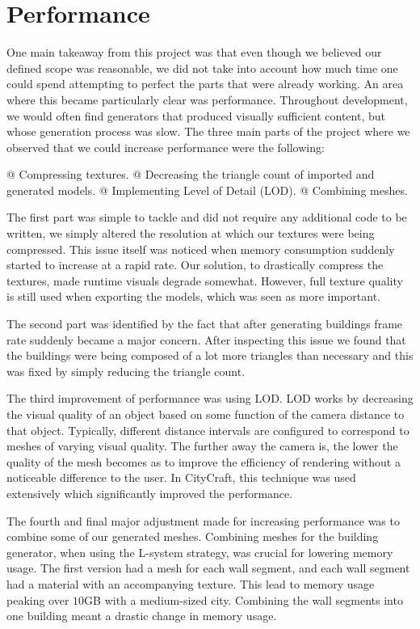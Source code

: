 \section{Performance}

One main takeaway from this project was that even though we believed our defined scope was reasonable, we did not take into account how much time one could spend attempting to perfect the parts that were already working.
An area where this became particularly clear was performance.
Throughout development, we would often find generators that produced visually sufficient content, but whose generation process was slow. 
The three main parts of the project where we observed that we could increase performance were the following:

\begin{easylist}
  @ Compressing textures.
  @ Decreasing the triangle count of imported and generated models.
  @ Implementing Level of Detail (LOD).
  @ Combining meshes. 
\end{easylist}
 
The first part was simple to tackle and did not require any additional code to be written, we simply altered the resolution at which our textures were being compressed.
This issue itself was noticed when memory consumption suddenly started to increase at a rapid rate.
Our solution, to drastically compress the textures, made runtime visuals degrade somewhat.
However, full texture quality is still used when exporting the models, which was seen as more important.

The second part was identified by the fact that after generating buildings frame rate suddenly became a major concern. 
After inspecting this issue we found that the buildings were being composed of a lot more triangles than necessary and this was fixed by simply reducing the triangle count. 

The third improvement of performance was using LOD.
LOD works by decreasing the visual quality of an object based on some function of the camera distance to that object.
Typically, different distance intervals are configured to correspond to meshes of varying visual quality.
The further away the camera is, the lower the quality of the mesh becomes as to improve the efficiency of rendering without a noticeable difference to the user.
In CityCraft, this technique was used extensively which significantly improved the performance.

The fourth and final major adjustment made for increasing performance was to combine some of our generated meshes. 
Combining meshes for the building generator, when using the L-system strategy, was crucial for lowering memory usage. 
The first version had a mesh for each wall segment, and each wall segment had a material with an accompanying texture. 
This lead to memory usage peaking over $10$GB with a medium-sized city. 
Combining the wall segments into one building meant a drastic change in memory usage. 

